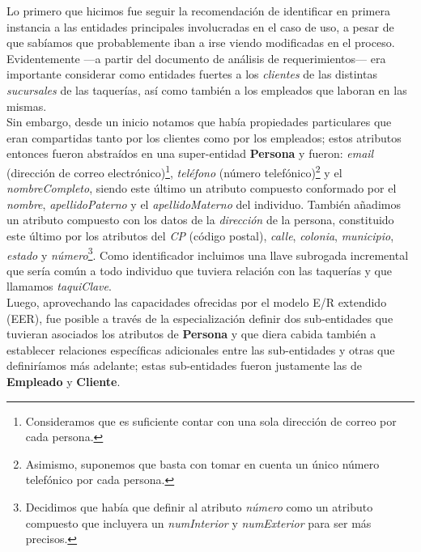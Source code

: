 \documentclass[11pt,letterpaper]{article}
\begin{document}
Lo primero que hicimos fue seguir la recomendación de identificar en primera instancia a las entidades principales involucradas en el caso de uso, a pesar de que sabíamos que probablemente iban a irse viendo modificadas en
el proceso. Evidentemente ---a partir del documento de análisis de requerimientos--- era importante considerar como entidades fuertes a los \textit{clientes} de las distintas \textit{sucursales} de las taquerías, así como también a los empleados que laboran en las mismas. \\

Sin embargo, desde un inicio notamos que había propiedades particulares que eran compartidas tanto por los clientes como por los empleados; estos atributos entonces fueron abstraídos en una super-entidad \textbf{Persona} y fueron: \textit{email} (dirección de correo electrónico)\footnote{Consideramos que es suficiente contar con una sola dirección de correo por cada persona.}, \textit{teléfono} (número telefónico)\footnote{Asimismo, suponemos que basta con tomar en cuenta un único número telefónico por cada persona.} y el \textit{nombreCompleto}, siendo este último un atributo compuesto conformado por el \textit{nombre}, \textit{apellidoPaterno} y el \textit{apellidoMaterno} del individuo. También añadimos un atributo compuesto con los datos de la \textit{dirección} de la persona, constituido este último por los atributos del \textit{CP} (código postal),  \textit{calle}, \textit{colonia}, \textit{municipio}, \textit{estado} y \textit{número}\footnote{Decidimos que había que definir al atributo \textit{número} como un atributo compuesto que incluyera un \textit{numInterior} y \textit{numExterior} para ser más precisos.}. Como identificador incluimos una llave subrogada incremental que sería común a todo individuo que tuviera relación con las taquerías y que llamamos \textit{taquiClave}.\\

Luego, aprovechando las capacidades ofrecidas por el modelo E/R extendido (EER), fue posible a través de la especialización definir dos sub-entidades que tuvieran asociados los atributos de \textbf{Persona} y que diera cabida también a establecer relaciones específicas adicionales entre las sub-entidades y otras que definiríamos más adelante; estas sub-entidades fueron justamente las de \textbf{Empleado} y \textbf{Cliente}.\\
\end{document}
